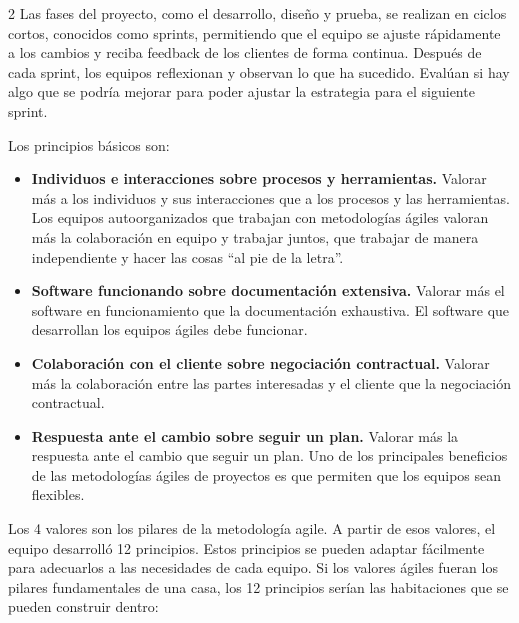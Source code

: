 \documentclass[10pt,a4paper]{article}
\begin{document}
\begin{multicols}{2}
Las fases del proyecto, como el desarrollo, diseño y prueba, se realizan en ciclos cortos, conocidos como sprints, permitiendo que el equipo se ajuste rápidamente a los cambios y reciba feedback de los clientes de forma continua. Después de cada sprint, los equipos reflexionan y observan lo que ha sucedido. Evalúan si hay algo que se podría mejorar para poder ajustar la estrategia para el siguiente sprint.

Los principios básicos son:

\begin{itemize}[leftmargin=*, noitemsep, topsep=0pt]
    \item \textbf{Individuos e interacciones sobre procesos y herramientas.} Valorar más a los individuos y sus interacciones que a los procesos y las herramientas. Los equipos autoorganizados que trabajan con metodologías ágiles valoran más la colaboración en equipo y trabajar juntos, que trabajar de manera independiente y hacer las cosas “al pie de la letra”.
    \item \textbf{Software funcionando sobre documentación extensiva.} Valorar más el software en funcionamiento que la documentación exhaustiva. El software que desarrollan los equipos ágiles debe funcionar.
    \item \textbf{Colaboración con el cliente sobre negociación contractual.} Valorar más la colaboración entre las partes interesadas y el cliente que la negociación contractual.
    \item \textbf{Respuesta ante el cambio sobre seguir un plan.} Valorar más la respuesta ante el cambio que seguir un plan. Uno de los principales beneficios de las metodologías ágiles de proyectos es que permiten que los equipos sean flexibles.
\end{itemize}

Los 4 valores son los pilares de la metodología agile. A partir de esos valores, el equipo desarrolló 12 principios. Estos principios se pueden adaptar fácilmente para adecuarlos a las necesidades de cada equipo. Si los valores ágiles fueran los pilares fundamentales de una casa, los 12 principios serían las habitaciones que se pueden construir dentro:


\end{multicols}
\end{document}
